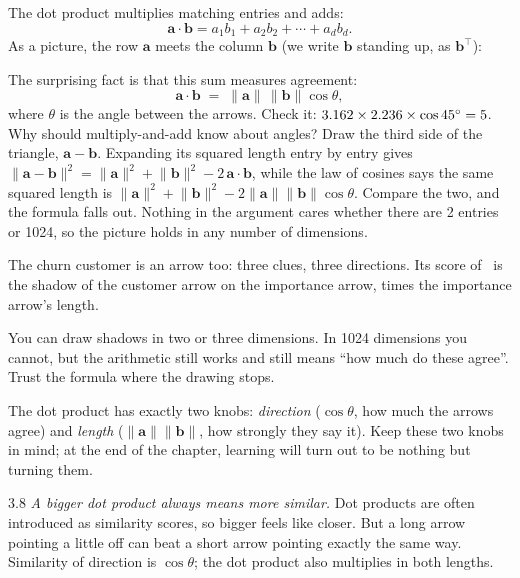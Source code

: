 \Exactly The dot product multiplies matching entries and adds:
\[
\bm{a}\cdot\bm{b} = a_1b_1 + a_2b_2 + \cdots + a_db_d .
\]
As a picture, the row $\bm{a}$ meets the column $\bm{b}$ (we write $\bm{b}$ standing up, as $\bm{b}^\top$):
\begin{center}\end{center}
The surprising fact is that this sum measures agreement:
\[
\bm{a}\cdot\bm{b} \;=\; \lVert\bm{a}\rVert\,\lVert\bm{b}\rVert\cos\theta ,
\]
where $\theta$ is the angle between the arrows. Check it: $3.162 \times 2.236 \times \cos 45^\circ =
5$. Why should multiply-and-add know about angles? Draw the third side of the triangle, $\bm{a}-\bm{b}$.
Expanding its squared length entry by entry gives $\lVert\bm{a}-\bm{b}\rVert^2 = \lVert\bm{a}\rVert^2 +
\lVert\bm{b}\rVert^2 - 2\,\bm{a}\cdot\bm{b}$, while the law of cosines says the same squared length is
$\lVert\bm{a}\rVert^2 + \lVert\bm{b}\rVert^2 - 2\lVert\bm{a}\rVert\lVert\bm{b}\rVert\cos\theta$. Compare the two,
and the formula falls out. Nothing in the argument cares whether there are 2 entries or 1024, so the picture
holds in any number of dimensions.

\Sanity The churn customer is an arrow too: three clues, three directions. Its score of \nThreeScore\ is the
shadow of the customer arrow on the importance arrow, times the importance arrow's length.

\begin{breaks}
You can draw shadows in two or three dimensions. In 1024 dimensions you cannot, but the arithmetic still works
and still means ``how much do these agree''. Trust the formula where the drawing stops.
\end{breaks}

\Why The dot product has exactly two knobs: \emph{direction} ($\cos\theta$, how much the arrows agree) and
\emph{length} ($\lVert\bm{a}\rVert\lVert\bm{b}\rVert$, how strongly they say it). Keep these two knobs in mind; at
the end of the chapter, learning will turn out to be nothing but turning them.

\begin{wrongidea}{3.8}
\emph{A bigger dot product always means more similar.} Dot products are often introduced as similarity scores,
so bigger feels like closer. But a long arrow pointing a little off can beat a short arrow pointing exactly the
same way. Similarity of direction is $\cos\theta$; the dot product also multiplies in both lengths.
\end{wrongidea}

